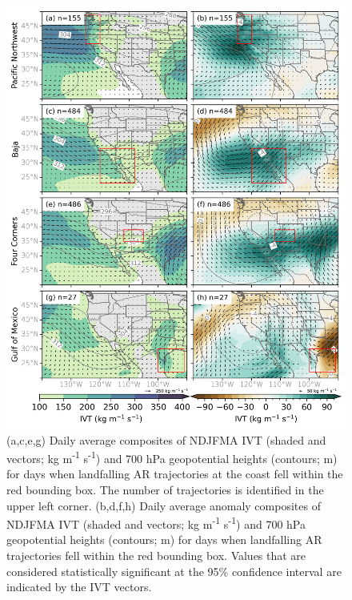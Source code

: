 \documentclass[draft]{agujournal2019}
\begin{document}
\begin{figure}
\noindent\includegraphics[width=\textwidth, height=\textheight, keepaspectratio]{fig7.png}

\caption{(a,c,e,g) Daily average composites of NDJFMA IVT (shaded and vectors; kg m\textsuperscript{-1} s\textsuperscript{-1}) and 700 hPa geopotential heights (contours; m) for days when landfalling AR trajectories at the coast fell within the red bounding box. The number of trajectories is identified in the upper left corner. (b,d,f,h) Daily average anomaly composites of NDJFMA IVT (shaded and vectors; kg m\textsuperscript{-1} s\textsuperscript{-1}) and 700 hPa geopotential heights (contours; m) for days when landfalling AR trajectories fell within the red bounding box. Values that are considered statistically significant at the 95\% confidence interval are indicated by the IVT vectors.}
\label{fig:composites_NDJFMA}
\end{figure}
\end{document}
